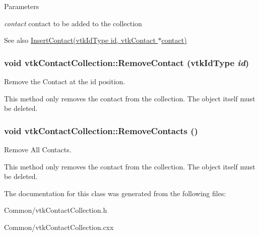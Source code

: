\begin{DoxyParams}{Parameters}
\item[{\em contact}]contact to be added to the collection \end{DoxyParams}
\begin{DoxySeeAlso}{See also}
\hyperlink{classvtkContactCollection_a0e50a84b758bf14a4936fffb51a39287}{InsertContact(vtkIdType id, vtkContact $\ast$contact)} 
\end{DoxySeeAlso}
\hypertarget{classvtkContactCollection_acb592cfee4ec93e6580d5a44da8b85c3}{
\subsubsection[{RemoveContact}]{\setlength{\rightskip}{0pt plus 5cm}void vtkContactCollection::RemoveContact (vtkIdType {\em id})}}
\label{classvtkContactCollection_acb592cfee4ec93e6580d5a44da8b85c3}


Remove the Contact at the id position. 

This method only removes the contact from the collection. The object itself must be deleted. \hypertarget{classvtkContactCollection_a9b85a9624245a174cd43c2c12962fd0c}{
\subsubsection[{RemoveContacts}]{\setlength{\rightskip}{0pt plus 5cm}void vtkContactCollection::RemoveContacts ()}}
\label{classvtkContactCollection_a9b85a9624245a174cd43c2c12962fd0c}


Remove All Contacts. 

This method only removes the contact from the collection. The object itself must be deleted. 

The documentation for this class was generated from the following files:\begin{DoxyCompactItemize}
\item 
Common/vtkContactCollection.h\item 
Common/vtkContactCollection.cxx\end{DoxyCompactItemize}
